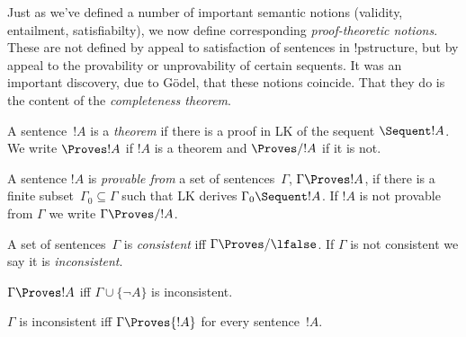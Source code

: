 \documentclass[../../include/open-logic-section]{subfiles}
\begin{document}

\begin{explain}
Just as we've defined a number of important semantic notions
(validity, entailment, satisfiabilty), we now define corresponding
\emph{proof-theoretic notions}. These are not defined by appeal to
satisfaction of sentences in !p{structure}, but by appeal to the
provability or unprovability of certain sequents.  It was an important
discovery, due to G\"odel, that these notions coincide.  That they do
is the content of the \emph{completeness theorem}.
\end{explain}

\begin{defn}[Theorems]
A sentence~$!A$ is a \emph{theorem} if there is a proof in LK of the
sequent $\Sequent !A$. We write $\Proves !A$ if $!A$ is a theorem and
$\Proves/ !A$ if it is not.
\end{defn}

\begin{defn}[Provability]
A sentence $!A$ is \emph{provable from} a set of sentences~$\Gamma$,
$\Gamma \Proves !A$, if there is a finite subset~$\Gamma_0 \subseteq
\Gamma$ such that LK derives $\Gamma_0 \Sequent !A$.  If $!A$ is not
provable from $\Gamma$ we write $\Gamma \Proves/ !A$.
\end{defn}

\begin{defn}[Consistency]
A set of sentences~$\Gamma$ is \emph{consistent} iff $\Gamma \Proves/
\lfalse$.  If $\Gamma$ is not consistent we say it is \emph{inconsistent}.
\end{defn}

\begin{prop}
$\Gamma \Proves !A$ iff $\Gamma \cup \{\lnot A\}$ is inconsistent.
\end{prop}

\begin{prop}
$\Gamma$ is inconsistent iff $\Gamma \Proves {!A}$ for every sentence~$!A$.
\end{prop}
\end{document}
